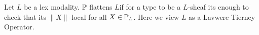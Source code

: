 \begin{definition}
	Let $L$ be a lex modality.
	$\mathbb{P}$ flattens $L$if for a type to be a $L$-sheaf its enough to check that its $\|X\|$-local for all $X \in \mathbb{P}_L$. Here we view $L$ as a Lavwere Tierney Operator.
	
\end{definition}
%
%	

